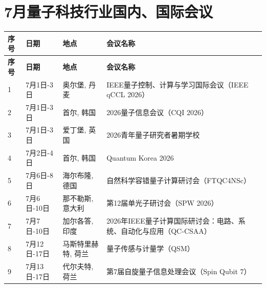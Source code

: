 \documentclass[12pt,a4paper]{ctexart}
\begin{document}
{
    \newpage
    \section*{ 7月量子科技行业国内、国际会议}
    \scriptsize
    \begin{longtable}{C{0.8cm}L{2.5cm}L{3cm}L{7cm}}
        \toprule[1.5pt]
        \textbf{序号} & \textbf{日期} & \textbf{地点} & \textbf{会议名称} \\
        \midrule
        \endfirsthead
        \toprule
        \textbf{序号} & \textbf{日期} & \textbf{地点} & \textbf{会议名称} \\
        \midrule
        \endhead
        \bottomrule
        \endfoot
        
        1 & 7月1日-3日 & 奥尔堡, 丹麦 & IEEE量子控制、计算与学习国际会议（IEEE qCCL 2026） \\
        \midrule[0.05pt]
        
        2 & 7月1日-3日 & 首尔, 韩国 & 2026量子信息会议（CQI 2026） \\
        \midrule[0.05pt]
        
        3 & 7月1日-3日 & 爱丁堡, 英国 & 2026青年量子研究者暑期学校 \\
        \midrule[0.05pt]
        
        4 & 7月2日-4日 & 首尔, 韩国 & Quantum Korea 2026 \\
        \midrule[0.05pt]
        
        5 & 7月6日-8日 & 海尔布隆, 德国 & 自然科学容错量子计算研讨会（FTQC4NSc） \\
        \midrule[0.05pt]
        
        6 & 7月6日-10日 & 那不勒斯, 意大利 & 第12届单光子研讨会（SPW 2026） \\
        \midrule[0.05pt]
        
        7 & 7月7日-10日 & 加尔各答, 印度 & 2026年IEEE量子计算国际研讨会：电路、系统、自动化与应用（QC-CSAA） \\
        \midrule[0.05pt]
        
        8 & 7月12日-17日 & 马斯特里赫特, 荷兰 & 量子传感与计量学（QSM） \\
        \midrule[0.05pt]
        
        9 & 7月13日-17日 & 代尔夫特, 荷兰 & 第7届自旋量子信息处理会议（Spin Qubit 7） \\
        \midrule[0.05pt]
        

\end{longtable}}
\end{document}
